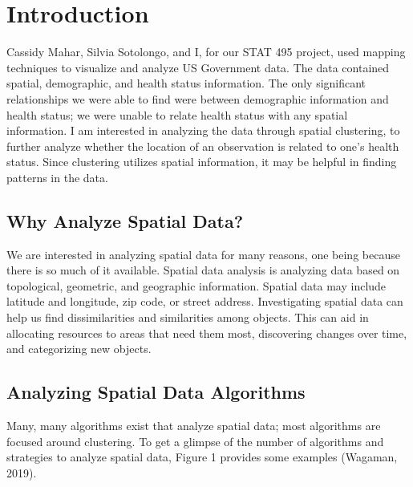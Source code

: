 \documentclass[12pt,twoside]{amherstthesis}
\begin{document}
  \onehalfspacing
  
  \chapter*{Introduction}\label{introduction}
  
  Cassidy Mahar, Silvia Sotolongo, and I, for our STAT 495 project, used
  mapping techniques to visualize and analyze US Government data. The data
  contained spatial, demographic, and health status information. The only
  significant relationships we were able to find were between demographic
  information and health status; we were unable to relate health status
  with any spatial information. I am interested in analyzing the data
  through spatial clustering, to further analyze whether the location of
  an observation is related to one's health status. Since clustering
  utilizes spatial information, it may be helpful in finding patterns in
  the data.
  
  \section{Why Analyze Spatial Data?}\label{why-analyze-spatial-data}
  
  We are interested in analyzing spatial data for many reasons, one being
  because there is so much of it available. Spatial data analysis is
  analyzing data based on topological, geometric, and geographic
  information. Spatial data may include latitude and longitude, zip code,
  or street address. Investigating spatial data can help us find
  dissimilarities and similarities among objects. This can aid in
  allocating resources to areas that need them most, discovering changes
  over time, and categorizing new objects.
  
  \section{Analyzing Spatial Data
  Algorithms}\label{analyzing-spatial-data-algorithms}
  
  Many, many algorithms exist that analyze spatial data; most algorithms
  are focused around clustering. To get a glimpse of the number of
  algorithms and strategies to analyze spatial data, Figure 1 provides
  some examples (Wagaman, 2019).
  
\end{document}
